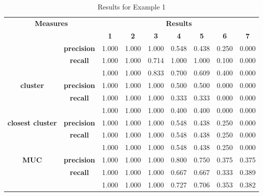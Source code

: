 \documentclass[12pt, letterpaper]{article}
\begin{document}
\captionsetup{labelfont=bf} %
\begin{table}
\caption{Results for Example 1}
\vspace{12pt} 
\begin{tabular}{|c| c|c ||c|c|c|c|c|c|c|}
	\hline 
	\multicolumn{3}{|c||}{\multirow{2}{*}{\textbf{Measures}}} & \multicolumn{7}{c|}{\textbf{Results}}
	\\ \cline{4-10} 
	\multicolumn{3}{|c||}{}	&\textbf{1}	&\textbf{2}	&\textbf{3}	&\textbf{4}	&\textbf{5}	&\textbf{6}	&\textbf{7} 
	\\ \specialrule{.1em}{.05em}{.05em}
	\multirow{3}{*}{\textbf{pairwise}} 
	& \multicolumn{2}{|c||}{\textbf{precision}}	&1.000	&1.000	&1.000	&0.548	&0.438	&0.250	&0.000
	\\ \cline{2-10}
	& \multicolumn{2}{|c||}{\textbf{recall}}	&1.000	&1.000	&0.714	&1.000	&1.000	&0.100	&0.000
	\\ \cline{2-10}
	& \multicolumn{2}{|c||}{\pmb{$F_1$}}		&1.000	&1.000	&0.833	&0.700	&0.609	&0.400	&0.000
	\\ \hline \hline 
	\multirow{3}{*}{\textbf{cluster}} 
	& \multicolumn{2}{|c||}{\textbf{precision}}	&1.000	&1.000	&1.000	&0.500	&0.500	&0.000	&0.000
	\\ \cline{2-10}
	& \multicolumn{2}{|c||}{\textbf{recall}}	&1.000	&1.000	&1.000	&0.333	&0.333	&0.000	&0.000
	\\ \cline{2-10}
	& \multicolumn{2}{|c||}{\pmb{$F_1$}}		&1.000	&1.000	&1.000	&0.400	&0.400	&0.000	&0.000
	\\ \hline \hline
	\multirow{3}{*}{\textbf{closest cluster}} 
	& \multicolumn{2}{|c||}{\textbf{precision}}	&1.000	&1.000	&1.000	&0.548	&0.438	&0.250	&0.000
	\\ \cline{2-10}
	& \multicolumn{2}{|c||}{\textbf{recall}}	&1.000	&1.000	&1.000	&0.548	&0.438	&0.250	&0.000
	\\ \cline{2-10}
	& \multicolumn{2}{|c||}{\pmb{$F_1$}}		&1.000	&1.000	&1.000	&0.548	&0.438	&0.250	&0.000
	\\ \hline \hline
\multirow{3}{*}{\textbf{MUC}} 
	& \multicolumn{2}{|c||}{\textbf{precision}}	&1.000	&1.000	&1.000	&0.800	&0.750	&0.375	&0.375
	\\ \cline{2-10}
	& \multicolumn{2}{|c||}{\textbf{recall}}	&1.000	&1.000	&1.000	&0.667	&0.667	&0.333	&0.389
	\\ \cline{2-10}
	& \multicolumn{2}{|c||}{\pmb{$F_1$}}		&1.000	&1.000	&1.000	&0.727	&0.706	&0.353	&0.382
	\\ \hline \hline

\end{tabular}
\end{table}
\end{document}
